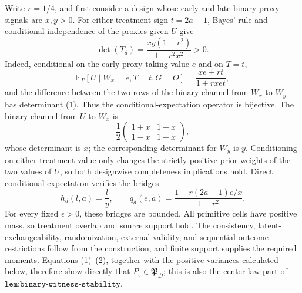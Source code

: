 Write \(r=1/4\), and first consider a design whose early and late binary-proxy signals are \(x,y>0\).  For either treatment sign \(t=2a-1\), Bayes' rule and conditional independence of the proxies given \(U\) give
\[
 \det(T_d)=\frac{xy(1-r^2)}{1-r^2x^2}>0. \tag{1}
\]
Indeed, conditional on the early proxy taking value \(e\) and on \(T=t\),
\[
 \mathbb E_P[U\mid W_x=e,T=t,G=O]
 =\frac{xe+rt}{1+rxet},
\]
and the difference between the two rows of the binary channel from \(W_x\) to \(W_y\) has determinant (1).  Thus the conditional-expectation operator is bijective.  The binary channel from \(U\) to \(W_x\) is
\[
 \frac12\begin{pmatrix}1+x&1-x\\1-x&1+x\end{pmatrix},
\]
whose determinant is \(x\); the corresponding determinant for \(W_y\) is \(y\).  Conditioning on either treatment value only changes the strictly positive prior weights of the two values of \(U\), so both designwise completeness implications hold.  Direct conditional expectation verifies the bridges
\[
 h_d(l,a)=\frac{l}{y},
 \qquad
 q_d(e,a)=\frac{1-r(2a-1)e/x}{1-r^2}. \tag{2}
\]
For every fixed \(\epsilon>0\), these bridges are bounded.  All primitive cells have positive mass, so treatment overlap and source support hold.  The consistency, latent-exchangeability, randomization, external-validity, and sequential-outcome restrictions follow from the construction, and finite support supplies the required moments.  Equations (1)--(2), together with the positive variances calculated below, therefore show directly that \(P_\epsilon\in\mathfrak P_{\mathcal D}\); this is also the center-law part of \(\texttt{lem:binary-witness-stability}\).

